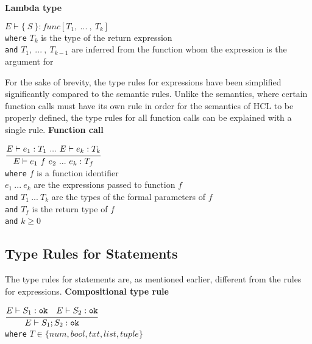 \textbf{Lambda type}\\
\begin{center}
	\begin{math}
	E \vdash \{\ S\ \} : func[T_1,\ .
	.
	.
	\ ,\ T_k]
	\end{math}
	\\[1\baselineskip]
	\texttt{where} $T_k$ is the type of the return expression\\
	\texttt{and} $T_1, \ .
	.
	.
	\ ,\ T_{k-1}$ are inferred from the function whom the expression is the argument for%
\end{center}

For the sake of brevity, the type rules for expressions have been simplified significantly compared to the semantic rules.
Unlike the semantics, where certain function calls must have its own rule in order for the semantics of HCL to be properly defined, the type rules for all function calls can be explained with a single rule.
\textbf{Function call}\\
\begin{center}
	\begin{math}
		\cfrac
		{E \vdash e_1 : T_1 \ .
		.
		.
		\ E \vdash e_k : T_k}
		{E \vdash e_1\ f\ e_2 \ .
		.
		.
		\ e_k : T_f}
	\end{math}
	\\[1\baselineskip]
	\texttt{where} $f$ is a function identifier\\
	$e_1\ .
	.
	.
	\ e_k$ are the expressions passed to function $f$\\
	\texttt{and} $T_1\ .
	.
	.
	\ T_k$ are the types of the formal parameters of $f$\\
	\texttt{and} $T_f$ is the return type of $f$\\
	\texttt{and} $k \ge 0$
\end{center}



\subsection{Type Rules for Statements}
The type rules for statements are, as mentioned earlier, different from the rules for expressions.
\textbf{Compositional type rule}\\
\begin{center}
	\begin{math}
	\cfrac
	{E \vdash S_1 : \texttt{ok}\quad E \vdash S_2 : \texttt{ok}}
	{E \vdash S_1;S_2 : \texttt{ok}}
	\end{math}
	\\[1\baselineskip]
	\texttt{where} $T \in \{num, bool, txt, list, tuple\}$
\end{center}


